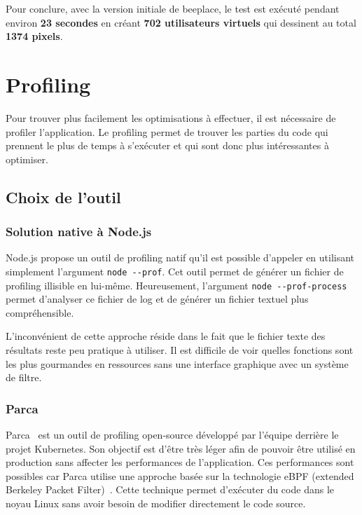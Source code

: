 Pour conclure, avec la version initiale de \gls{beeplace}, le test est exécuté pendant environ \textbf{23 secondes} en créant \textbf{702 utilisateurs virtuels} qui dessinent au total \textbf{1374 pixels}.

\section{Profiling}

Pour trouver plus facilement les optimisations à effectuer, il est nécessaire de profiler l'application. Le profiling permet de trouver les parties du code qui prennent le plus de temps à s'exécuter et qui sont donc plus intéressantes à optimiser.

\subsection{Choix de l'outil}

\subsubsection{Solution native à Node.js}

Node.js propose un outil de profiling natif qu'il est possible d'appeler en utilisant simplement l'argument \texttt{node -{}-prof}. Cet outil permet de générer un fichier de profiling illisible en lui-même. Heureusement, l'argument \texttt{node -{}-prof-process} permet d'analyser ce fichier de log et de générer un fichier textuel plus compréhensible.

L'inconvénient de cette approche réside dans le fait que le fichier texte des résultats reste peu pratique à utiliser. Il est difficile de voir quelles fonctions sont les plus gourmandes en ressources sans une interface graphique avec un système de filtre.

\subsubsection{Parca}

Parca~\cite{parca} est un outil de profiling open-source développé par l'équipe derrière le projet Kubernetes. Son objectif est d'être très léger afin de pouvoir être utilisé en production sans affecter les performances de l'application. Ces performances sont possibles car Parca utilise une approche basée sur la technologie eBPF (extended Berkeley Packet Filter)~\cite{ebpf}. Cette technique permet d'exécuter du code dans le noyau Linux sans avoir besoin de modifier directement le code source.


